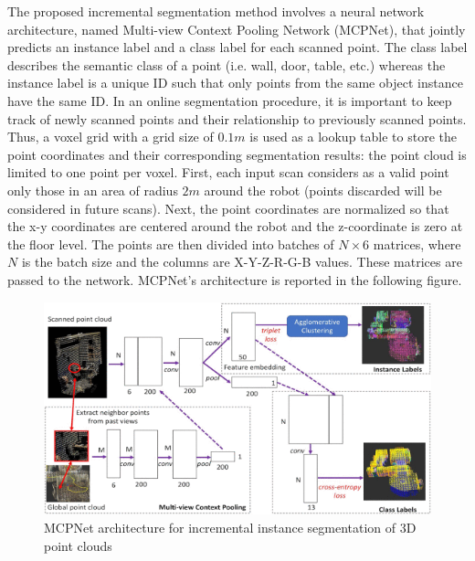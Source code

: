 The proposed incremental segmentation method involves a neural network
architecture, named Multi-view Context Pooling Network (MCPNet), that
jointly predicts an instance label and a class label for each scanned
point. The class label describes the semantic class of a point (i.e.
wall, door, table, etc.) whereas the instance label is a unique ID such
that only points from the same object instance have the same ID. In an
online segmentation procedure, it is important to keep track of newly
scanned points and their relationship to previously scanned points.
Thus, a voxel grid with a grid size of $0.1m$ is used as a lookup
table to store the point coordinates and their corresponding
segmentation results: the point cloud is limited to one point per voxel.
First, each input scan considers as a valid point only those in an area
of radius $2m$ around the robot (points discarded will be considered
in future scans). Next, the point coordinates are normalized so that the
x-y coordinates are centered around the robot and the z-coordinate is
zero at the floor level. The points are then divided into batches of
$N\times 6$ matrices, where $N$ is the batch size and the columns
are X-Y-Z-R-G-B values. These matrices are passed to the network.
MCPNet's architecture is reported in the following figure.

\begin{figure}[h!]
\centering
\includegraphics[width=0.91\linewidth]{images/MCPNetarc.png}
\caption{MCPNet architecture for incremental instance segmentation of 3D point clouds}
\end{figure}

